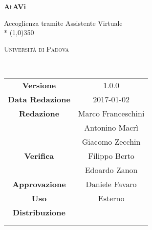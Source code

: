 \documentclass[12pt]{article}
\date{\today}
\begin{document}
	\begin{titlepage}
		\centering
		{\huge\bfseries AtAVi\par}
		Accoglienza tramite Assistente Virtuale \\*
		\line(1,0){350} \\
		{\scshape\LARGE Università di Padova \par}
		\vspace{1cm}
		{\scshape\Large \glossarioi\ \par}
		\logo
		\newpage
		\begin{tabular}{c|c}
			{\hfill\textbf{Versione}} 			& 1.0.0			\\ 
			{\hfill\textbf{Data Redazione}} 	& 2017-01-02 		\\ 
			{\hfill\textbf{Redazione}} 			& Marco Franceschini \\ & Antonino Macrì \\ & Giacomo Zecchin \\ 
			{\hfill\textbf{Verifica}} 			& Filippo Berto \\ & Edoardo Zanon \\ 
			{\hfill\textbf{Approvazione}} 		& Daniele Favaro				\\
			{\hfill\textbf{Uso}} 				& Esterno 			\\
			{\hfill\textbf{Distribuzione}} 		& \vardanega \\ & \cardin \\ & \prop \\
		\end{tabular}
	\end{titlepage}
	
	\pagestyle{myfront}
	\newpage
			
	
	\label{LastFrontPage}
		\newpage
			\pagestyle{mymain}
			\glsaddall
			\printglossary[style=myaltlistgroup, title=, toctitle=Glossario dei termini] 

	\label{LastPage}
\end{document}
